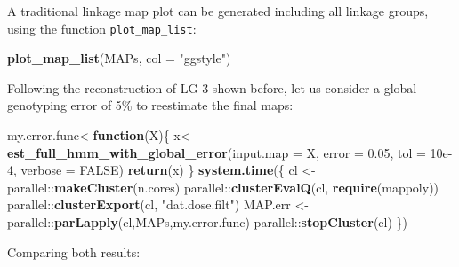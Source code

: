 \documentclass[
]{article}
\newenvironment{Shaded}{}{}
\newcommand{\ControlFlowTok}[1]{\textcolor[rgb]{0.00,0.44,0.13}{\textbf{#1}}}
\newcommand{\DataTypeTok}[1]{\textcolor[rgb]{0.56,0.13,0.00}{#1}}
\newcommand{\DecValTok}[1]{\textcolor[rgb]{0.25,0.63,0.44}{#1}}
\newcommand{\FloatTok}[1]{\textcolor[rgb]{0.25,0.63,0.44}{#1}}
\newcommand{\KeywordTok}[1]{\textcolor[rgb]{0.00,0.44,0.13}{\textbf{#1}}}
\newcommand{\NormalTok}[1]{#1}
\newcommand{\OperatorTok}[1]{\textcolor[rgb]{0.40,0.40,0.40}{#1}}
\newcommand{\OtherTok}[1]{\textcolor[rgb]{0.00,0.44,0.13}{#1}}
\newcommand{\StringTok}[1]{\textcolor[rgb]{0.25,0.44,0.63}{#1}}
\begin{document}
A traditional linkage map plot can be generated including all linkage
groups, using the function \texttt{plot\_map\_list}:

\begin{Shaded}
\begin{Highlighting}[]
\KeywordTok{plot_map_list}\NormalTok{(MAPs, }\DataTypeTok{col =} \StringTok{"ggstyle"}\NormalTok{)}
\end{Highlighting}
\end{Shaded}

Following the reconstruction of LG 3 shown before, let us consider a
global genotyping error of 5\% to reestimate the final maps:

\begin{Shaded}
\begin{Highlighting}[]
\NormalTok{my.error.func<-}\ControlFlowTok{function}\NormalTok{(X)\{}
\NormalTok{  x<-}\KeywordTok{est_full_hmm_with_global_error}\NormalTok{(}\DataTypeTok{input.map =}\NormalTok{ X, }
                                    \DataTypeTok{error =} \FloatTok{0.05}\NormalTok{, }
                                    \DataTypeTok{tol =} \FloatTok{10e-4}\NormalTok{, }
                                    \DataTypeTok{verbose =} \OtherTok{FALSE}\NormalTok{)}
  \KeywordTok{return}\NormalTok{(x)}
\NormalTok{\}}
\KeywordTok{system.time}\NormalTok{(\{}
\NormalTok{  cl <-}\StringTok{ }\NormalTok{parallel}\OperatorTok{::}\KeywordTok{makeCluster}\NormalTok{(n.cores)}
\NormalTok{  parallel}\OperatorTok{::}\KeywordTok{clusterEvalQ}\NormalTok{(cl, }\KeywordTok{require}\NormalTok{(mappoly))}
\NormalTok{  parallel}\OperatorTok{::}\KeywordTok{clusterExport}\NormalTok{(cl, }\StringTok{"dat.dose.filt"}\NormalTok{)}
\NormalTok{  MAP.err <-}\StringTok{ }\NormalTok{parallel}\OperatorTok{::}\KeywordTok{parLapply}\NormalTok{(cl,MAPs,my.error.func)}
\NormalTok{  parallel}\OperatorTok{::}\KeywordTok{stopCluster}\NormalTok{(cl)}
\NormalTok{\})}
\end{Highlighting}
\end{Shaded}

Comparing both results:

\begin{Shaded}
\end{Shaded}
\end{document}
